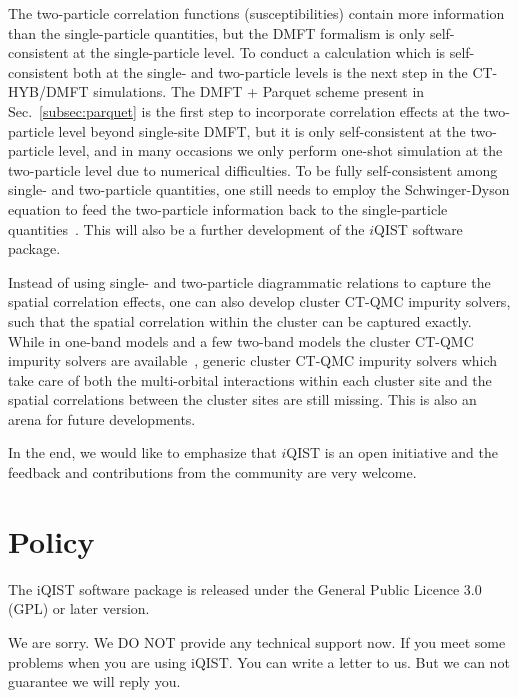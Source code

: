 The two-particle correlation functions (susceptibilities) contain more information than the single-particle quantities, but the DMFT formalism is only self-consistent at the single-particle level. To conduct a calculation which is self-consistent both at the single- and two-particle levels is the next step in the CT-HYB/DMFT simulations. The DMFT + Parquet scheme present in Sec.~\ref{subsec:parquet} is the first step to incorporate correlation effects at the two-particle level beyond single-site DMFT, but it is only self-consistent at the two-particle level, and in many occasions we only perform one-shot simulation at the two-particle level due to numerical difficulties. To be fully self-consistent among single- and two-particle quantities, one still needs to employ the Schwinger-Dyson equation to feed the two-particle information back to the single-particle quantities~\cite{PhysRevE.80.046706,PhysRevE.87.013311}. This will also be a further development of the $i$QIST software package.

Instead of using single- and two-particle diagrammatic relations to capture the spatial correlation effects, one can also develop cluster CT-QMC impurity solvers, such that the spatial correlation within the cluster can be captured exactly. While in one-band models and a few two-band models the cluster CT-QMC impurity solvers are available~\cite{RevModPhys.77.1027,RevModPhys.78.865,PhysRevB.88.041103,PhysRevB.88.245110,PhysRevB.89.195146}, generic cluster CT-QMC impurity solvers which take care of both the multi-orbital interactions within each cluster site and the spatial correlations between the cluster sites are still missing. This is also an arena for future developments.


In the end, we would like to emphasize that $i$QIST is an open initiative and the feedback and contributions from the community are very welcome.

\section{Policy}

The iQIST software package is released under the General Public Licence
 3.0 (GPL) or later version.

We are sorry. We DO NOT provide any technical support now. If you meet
some problems when you are using iQIST. You can write a letter to us. But
we can not guarantee we will reply you.
